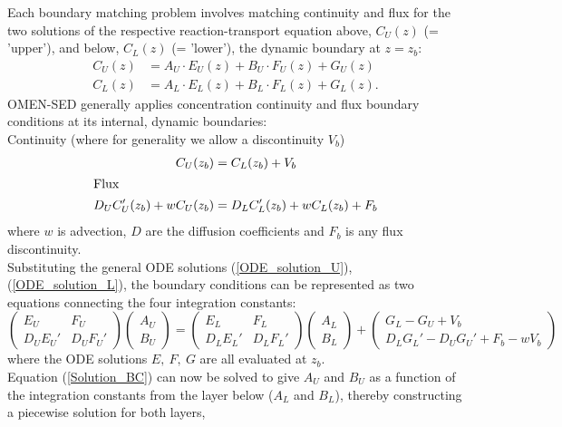 \documentclass[gmd, manuscript]{copernicus}
\begin{document}
Each boundary matching problem involves matching continuity and flux for the two solutions of the respective reaction-transport equation above, $C_U(z)$ (= 'upper'), and below, $C_L(z)$ (= 'lower'), 
the dynamic boundary at $z = z_b$:
\begin{align}
C_U(z) &= A_U \cdot E_U(z) + B_U \cdot F_U(z) + G_U(z) \label{ODE_solution_U}\\
C_L(z) &= A_L \cdot E_L(z) + B_L \cdot F_L(z) + G_L(z) .\label{ODE_solution_L}
\end{align}
OMEN-SED generally applies concentration continuity and flux boundary conditions at its internal, dynamic boundaries: \\
Continuity (where for generality we allow a discontinuity $V_b$) 
\begin{align}
  C_U(z_b) &= C_L(z_b) + V_b	\\
\intertext{Flux}
 D_U C_U'(z_b) + wC_U(z_b) &=  D_LC_L'(z_b) + wC_L(z_b) + F_b
\end{align}
where $w$ is advection, $D$ are the diffusion coefficients and $F_b$ is any flux discontinuity.\\[1em]
Substituting the general ODE solutions (\ref{ODE_solution_U}), (\ref{ODE_solution_L}), the boundary conditions can be represented as two equations connecting the four integration constants:
\begin{equation}
 \begin{pmatrix} E_U & F_U \\ D_UE_U' & D_UF_U' \end{pmatrix} \begin{pmatrix} A_U \\ B_U \end{pmatrix} = \begin{pmatrix} E_L & F_L \\ D_LE_L' & D_LF_L' \end{pmatrix} \begin{pmatrix} A_L \\ B_L \end{pmatrix} 
 + \begin{pmatrix} G_L - G_U + V_b \\ D_LG_L' - D_UG_U' + F_b - wV_b\end{pmatrix} \label{Solution_BC}
\end{equation}
where the ODE solutions $E,\ F,\ G$ are all evaluated at $z_b$.\\[1em]
Equation (\ref{Solution_BC}) can now be solved to give $A_U$ and $B_U$ as a function of the integration constants from the layer below ($A_L$ and $B_L$), thereby constructing a piecewise solution for both layers, 
\end{document}
